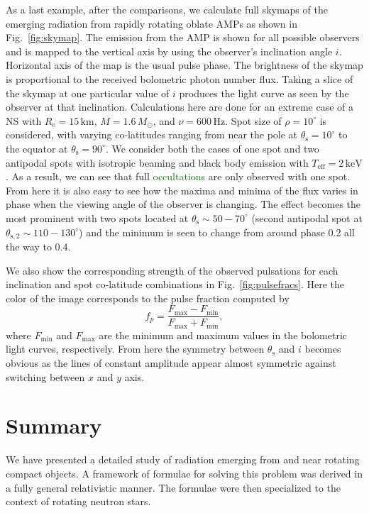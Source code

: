 \documentclass{aa}
\newcommand{\be}{\begin{equation}}
\newcommand{\ee}{\end{equation}}
\newcommand{\refe}[1]{\textcolor{green}{{#1}}}
\newcommand{\Msun}{\ensuremath{M_{\odot}}}
\begin{document}
As a last example, after the comparisons, we calculate full skymaps of the emerging radiation from rapidly rotating oblate AMPs as shown in Fig.~\ref{fig:skymap}.
The emission from the AMP is shown for all possible observers and is mapped to the vertical axis by using the observer's inclination angle $i$.
Horizontal axis of the map is the usual pulse phase.
The brightness of the skymap is proportional to the received bolometric photon number flux.
Taking a slice of the skymap at one particular value of $i$ produces the light curve as seen by the observer at that inclination.
Calculations here are done for an extreme case of a NS with $R_{\mathrm{e}} = 15\,\mathrm{km}$, $M=1.6\,\Msun$, and $\nu = 600\,\mathrm{Hz}$.
Spot size of $\rho = 10^{\circ}$ is considered, with varying co-latitudes ranging from near the pole at $\theta_{\mathrm{s}} = 10^{\circ}$ to the equator at $\theta_{\mathrm{s}} = 90^{\circ}$.
We consider both the cases of one spot and two antipodal spots with isotropic beaming and black body emission with $T_{\mathrm{eff}} = 2\,\mathrm{keV}$.
As a result, we can see that full \refe{occultations} are only observed with one spot.
From here it is also easy to see how the maxima and minima of the flux varies in phase when the viewing angle of the observer is changing.
The effect becomes the most prominent with two spots located at $\theta_{\mathrm{s}} \sim 50-70^{\circ}$ (second antipodal spot at $\theta_{\mathrm{s,2}} \sim 110-130^{\circ}$) and the minimum is seen to change from around phase 0.2 all the way to 0.4.

We also show the corresponding strength of the observed pulsations for each inclination and spot co-latitude combinations in Fig.~\ref{fig:pulsefracs}.
Here the color of the image corresponds to the pulse fraction computed by
\be
f_p = \frac{F_{\mathrm{max}} - F_{\mathrm{min}}}{F_{\mathrm{max}} + F_{\mathrm{min}}},
\ee
where $F_{\mathrm{min}}$ and $F_{\mathrm{max}}$ are the minimum and maximum values in the bolometric light curves, respectively.
From here the symmetry between $\theta_{\mathrm{s}}$ and $i$ becomes obvious as the lines of constant amplitude appear almost symmetric against switching between $x$ and $y$ axis.




\section{Summary}\label{sect:summary}
We have presented a detailed study of radiation emerging from and near rotating compact objects.
A framework of formulae for solving this problem was derived in a fully general relativistic manner. 
The formulae were then specialized to the context of rotating neutron stars.
\end{document}
